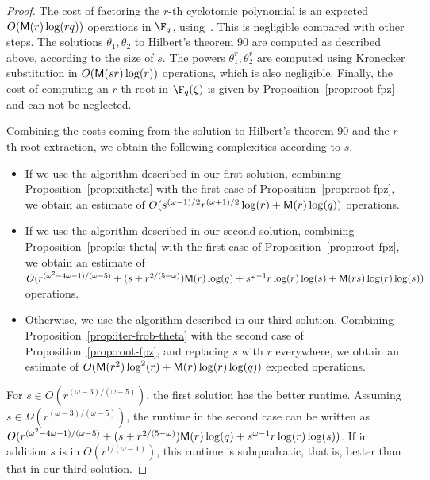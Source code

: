 \begin{proof}
  The cost of factoring the $r$-th cyclotomic polynomial is an
  expected \sloppy $O(\mathsf{M}(r)\log(rq))$ operations in $\F_q$,
  using~\cite[Theorem~9]{shoup94}. This is negligible compared with
  other steps. The solutions $\theta_1,\theta_2$ to Hilbert's theorem
  90 are computed as described above, according to the size of $s$.
  The powers $\theta_1^r,\theta_2^r$ are computed using Kronecker
  substitution in $O(\mathsf{M}(sr)\log(r))$ operations, which is also
  negligible. Finally, the cost of computing an $r$-th root in
  $\F_q(\zeta)$ is given by Proposition~\ref{prop:root-fpz} and can
  not be neglected.

  Combining the costs coming from the solution to Hilbert's theorem 90
  and the $r$-th root extraction, we obtain the following complexities
  according to $s$.
  \begin{itemize}
  \item If we use the algorithm described in
    our first solution, combining Proposition~\ref{prop:xitheta} with the first
    case of Proposition~\ref{prop:root-fpz}, we obtain an estimate of
    $O(s^{(\omega-1)/2}r^{(\omega+1)/2}\log(r)+\mathsf{M}(r)\log(q))$
    operations.
  \item If we use the algorithm described in
    our second solution, combining Proposition~\ref{prop:ks-theta} with the first
    case of Proposition~\ref{prop:root-fpz}, we obtain an estimate of
    $O( r^{(\omega^2-4\omega-1)/(\omega-5)}+(s+r^{2/(5-\omega)})\mathsf{M}(r)\log(q)
+s^{\omega-1}r\log(r)\log(s)+\mathsf{M}(rs)\log(r)\log(s))$
    operations.
  \item Otherwise, we use the algorithm described in our third solution. Combining
    Proposition~\ref{prop:iter-frob-theta} with the second case of
    Proposition~\ref{prop:root-fpz}, and replacing $s$ with $r$
    everywhere, we obtain an estimate of
    $O(\mathsf{M}(r^2)\log^2(r) + \mathsf{M}(r)\log(r)\log(q)) $ expected operations.
  \end{itemize}
  For $s\in O(r^{(\omega-3)/(\omega-5)})$, the first solution has the
  better runtime. Assuming $s\in \Omega(r^{(\omega-3)/(\omega-5)})$,
  the runtime in the second case can be written as $O(
  r^{(\omega^2-4\omega-1)/(\omega-5)}+(s+r^{2/(5-\omega)})\mathsf{M}(r)\log(q)
  +s^{\omega-1}r\log(r)\log(s))$. If in addition $s$ is in $O(r^{1/(\omega-1)})$,
  this runtime is subquadratic, that is, better than that in our third solution.
\end{proof}


